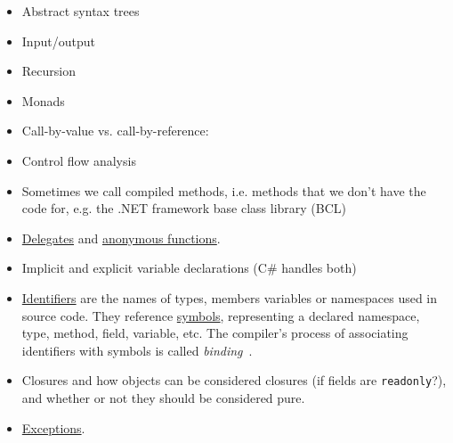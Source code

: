 \documentclass[a4paper,12pt]{article}
\begin{document}
\begin{itemize}
  \item Abstract syntax trees
  \item Input/output
  \item Recursion
  \item Monads
  \item Call-by-value vs. call-by-reference: %
  \item Control flow analysis
  \item Sometimes we call compiled methods, i.e. methods that we don't have the code for, e.g. the .NET framework base class library (BCL)
  \item \href{https://docs.microsoft.com/en-us/dotnet/csharp/programming-guide/delegates/}{Delegates} and \href{https://docs.microsoft.com/en-us/dotnet/csharp/programming-guide/statements-expressions-operators/anonymous-functions}{anonymous functions}.
  \item Implicit and explicit variable declarations (C\# handles both)
  \item \href{https://docs.microsoft.com/en-us/dotnet/csharp/programming-guide/inside-a-program/identifier-names}{Identifiers} are the names of types, members variables or namespaces used in source code. They reference \href{https://docs.microsoft.com/en-us/dotnet/csharp/roslyn-sdk/work-with-semantics#symbols}{symbols}, representing a declared namespace, type, method, field, variable, etc. The compiler's process of associating identifiers with symbols is called \textit{binding}~\cite{microsoft-semantic-analysis}. %
  \item Closures and how objects can be considered closures (if fields are \texttt{readonly}?), and whether or not they should be considered pure.
  \item \href{https://docs.microsoft.com/en-us/dotnet/csharp/programming-guide/exceptions/}{Exceptions}.
\end{itemize}
\end{document}
